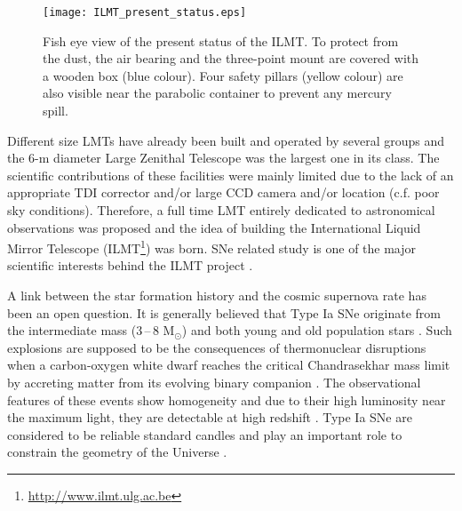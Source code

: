 \documentclass[useAMS,usenatbib]{mnras}
\begin{document}
\begin{figure}
\centering
\texttt{[image: ILMT\_present\_status.eps]}
\caption{Fish eye view of the present status of the ILMT.
To protect from the dust, the air bearing and the three-point mount are covered with a wooden box 
(blue colour). Four safety pillars (yellow colour) are also visible near the parabolic container 
to prevent any mercury spill.}
\label{ILMT_pan2}
\end{figure}

Different size LMTs have already been built and operated by several groups \citep[for example;][]
{1989ApJ...346L..41B,1994ApJ...436L.201H} and the 6-m diameter Large Zenithal Telescope 
\citep{2007PASP..119..444H} was the largest one in its class. The scientific contributions 
of these facilities were mainly limited due to the lack of an appropriate TDI corrector 
and/or large CCD camera and/or location (c.f. poor sky conditions). Therefore, a full time 
LMT entirely dedicated to astronomical observations was proposed and the idea of building 
the International Liquid Mirror Telescope (ILMT\footnote{\url{http://www.ilmt.ulg.ac.be}}) 
was born. SNe related study is one of the major scientific interests behind the ILMT project
\citep{2006SPIE.6267E...4S}.


A link between the star formation history and the cosmic supernova rate has been an open question.
It is generally believed that Type Ia SNe originate from the intermediate mass (3\,--\,8 M$_{\odot}$) 
and both young and old population stars \citep*[][for recent reviews]{2012NewAR..56..122W,
2014ARA&A..52..107M}. Such explosions are supposed to be the consequences of 
thermonuclear disruptions when a carbon-oxygen white dwarf reaches the critical Chandrasekhar mass 
limit \citep[$\simeq$1.4 M$_{\odot}$,][]{1931ApJ....74...81C} by accreting matter from its evolving 
binary companion \citep*{1960ApJ...132..565H,1973ApJ...186.1007W,1986ApJ...301..601W,2000ARA&A..38..191H}. 
The observational features of these events show homogeneity and due to their high luminosity near 
the maximum light, they are detectable at high redshift \citep{2005ASSL..332...97F}. Type Ia SNe are 
considered to be reliable standard candles \citep{1992ARA&A..30..359B,1993ApJ...413L.105P} and play 
an important role to constrain the geometry of the Universe \citep[e.g.][]{1998AJ....116.1009R,
1999ApJ...517..565P,2007ApJ...659...98R}.
\end{document}
